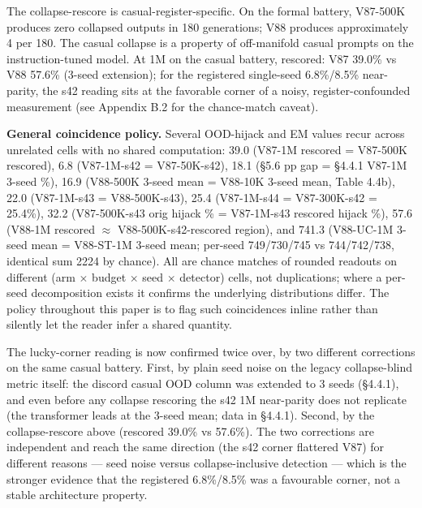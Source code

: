 \documentclass[11pt]{article}
\begin{document}
The collapse-rescore is casual-register-specific. On the formal battery, V87-500K produces zero collapsed outputs in 180 generations; V88 produces approximately 4 per 180. The casual collapse is a property of off-manifold casual prompts on the instruction-tuned model. At 1M on the casual battery, rescored: V87 39.0\% vs V88 57.6\% (3-seed extension); for the registered single-seed 6.8\%/8.5\% near-parity, the s42 reading sits at the favorable corner of a noisy, register-confounded measurement (see Appendix B.2 for the chance-match caveat).

\textbf{General coincidence policy.} Several OOD-hijack and EM values recur across unrelated cells with no shared computation: 39.0 (V87-1M rescored = V87-500K rescored), 6.8 (V87-1M-s42 = V87-50K-s42), 18.1 (\S5.6 pp gap = \S4.4.1 V87-1M 3-seed \%), 16.9 (V88-500K 3-seed mean = V88-10K 3-seed mean, Table 4.4b), 22.0 (V87-1M-s43 = V88-500K-s43), 25.4 (V87-1M-s44 = V87-300K-s42 = 25.4\%), 32.2 (V87-500K-s43 orig hijack \% = V87-1M-s43 rescored hijack \%), 57.6 (V88-1M rescored $\approx$ V88-500K-s42-rescored region), and 741.3 (V88-UC-1M 3-seed mean = V88-ST-1M 3-seed mean; per-seed 749/730/745 vs 744/742/738, identical sum 2224 by chance). All are chance matches of rounded readouts on different (arm $\times$ budget $\times$ seed $\times$ detector) cells, not duplications; where a per-seed decomposition exists it confirms the underlying distributions differ. The policy throughout this paper is to flag such coincidences inline rather than silently let the reader infer a shared quantity.

The lucky-corner reading is now confirmed twice over, by two different corrections on the same casual battery. First, by plain seed noise on the legacy collapse-blind metric itself: the discord casual OOD column was extended to 3 seeds (\S4.4.1), and even before any collapse rescoring the s42 1M near-parity does not replicate (the transformer leads at the 3-seed mean; data in \S4.4.1). Second, by the collapse-rescore above (rescored 39.0\% vs 57.6\%). The two corrections are independent and reach the same direction (the s42 corner flattered V87) for different reasons --- seed noise versus collapse-inclusive detection --- which is the stronger evidence that the registered 6.8\%/8.5\% was a favourable corner, not a stable architecture property.
\end{document}
